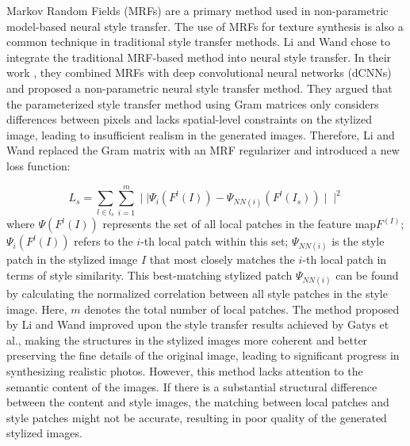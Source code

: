 \documentclass[preprint,12pt]{elsarticle}
\begin{document}
Markov Random Fields (MRFs) are a primary method used in non-parametric model-based neural style transfer\citep{29li1994markov,30cross1983markov,31chellappa1985texture,32bennett1998multispectral}. The use of MRFs for texture synthesis is also a common technique in traditional style transfer methods. Li and Wand \citep{33li2016combining} chose to integrate the traditional MRF-based method into neural style transfer. In their work \citep{33li2016combining}, they combined MRFs with deep convolutional neural networks (dCNNs) and proposed a non-parametric neural style transfer method. They argued that the parameterized style transfer method using Gram matrices only considers differences between pixels and lacks spatial-level constraints on the stylized image, leading to insufficient realism in the generated images. Therefore, Li and Wand replaced the Gram matrix with an MRF regularizer and introduced a new loss function:

\begin{equation}
    L_s=\sum_{l\in {l_s}}\sum_{i=1}^m \mid\mid\Psi_i(F^l(I))-\Psi_{NN(i)}(F^l(I_s))\mid\mid^2
\end{equation}
where $\Psi(F^l(I))$ represents the set of all local patches in the feature map$F^(I)$; $\Psi_i(F^l(I))$ refers to the $i$-th local patch within this set; $\Psi_{NN(i)}$ is the style patch in the stylized image $I$ that most closely matches the $i$-th local patch in terms of style similarity. This best-matching stylized patch $\Psi_{NN(i)}$ can be found by calculating the normalized correlation between all style patches in the style image. Here, $m$ denotes the total number of local patches. The method proposed by Li and Wand improved upon the style transfer results achieved by Gatys et al.\citep{02gatys2016image}, making the structures in the stylized images more coherent and better preserving the fine details of the original image, leading to significant progress in synthesizing realistic photos. However, this method lacks attention to the semantic content of the images. If there is a substantial structural difference between the content and style images, the matching between local patches and style patches might not be accurate, resulting in poor quality of the generated stylized images.
\end{document}
